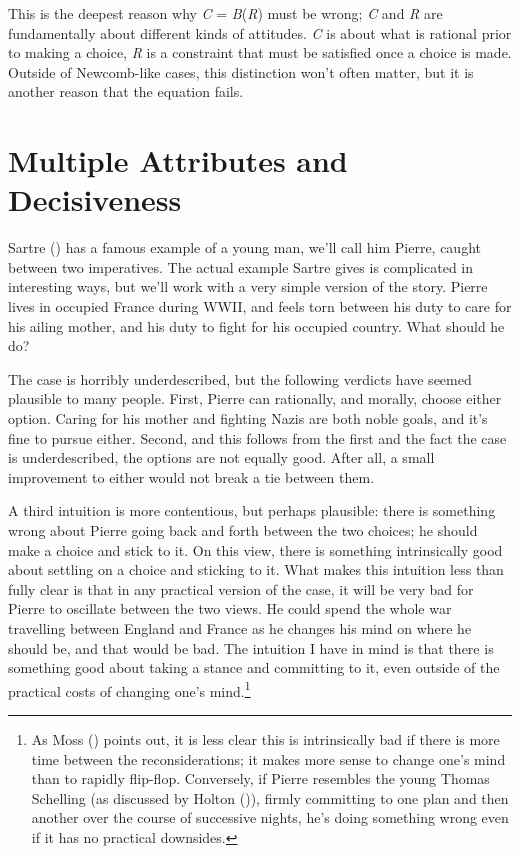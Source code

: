 \documentclass[
  11pt,
  letterpaper,
  DIV=11,
  numbers=noendperiod,
  twoside]{scrartcl}
\begin{document}
This is the deepest reason why \emph{C} = \emph{B}(\emph{R}) must be
wrong; \emph{C} and \emph{R} are fundamentally about different kinds of
attitudes. \emph{C} is about what is rational prior to making a choice,
\emph{R} is a constraint that must be satisfied once a choice is made.
Outside of Newcomb-like cases, this distinction won't often matter, but
it is another reason that the equation fails.

\section{Multiple Attributes and Decisiveness}\label{sec-sartre}

Sartre () has a famous example of a
young man, we'll call him Pierre, caught between two imperatives. The
actual example Sartre gives is complicated in interesting ways, but
we'll work with a very simple version of the story. Pierre lives in
occupied France during WWII, and feels torn between his duty to care for
his ailing mother, and his duty to fight for his occupied country. What
should he do?

The case is horribly underdescribed, but the following verdicts have
seemed plausible to many people. First, Pierre can rationally, and
morally, choose either option. Caring for his mother and fighting Nazis
are both noble goals, and it's fine to pursue either. Second, and this
follows from the first and the fact the case is underdescribed, the
options are not equally good. After all, a small improvement to either
would not break a tie between them.

A third intuition is more contentious, but perhaps plausible: there is
something wrong about Pierre going back and forth between the two
choices; he should make a choice and stick to it. On this view, there is
something intrinsically good about settling on a choice and sticking to
it. What makes this intuition less than fully clear is that in any
practical version of the case, it will be very bad for Pierre to
oscillate between the two views. He could spend the whole war travelling
between England and France as he changes his mind on where he should be,
and that would be bad. The intuition I have in mind is that there is
something good about taking a stance and committing to it, even outside
of the practical costs of changing one's mind.\footnote{As Moss
  () points out, it is less clear this is
  intrinsically bad if there is more time between the reconsiderations;
  it makes more sense to change one's mind than to rapidly flip-flop.
  Conversely, if Pierre resembles the young Thomas Schelling (as
  discussed by Holton ()), firmly
  committing to one plan and then another over the course of successive
  nights, he's doing something wrong even if it has no practical
  downsides.}
\end{document}
